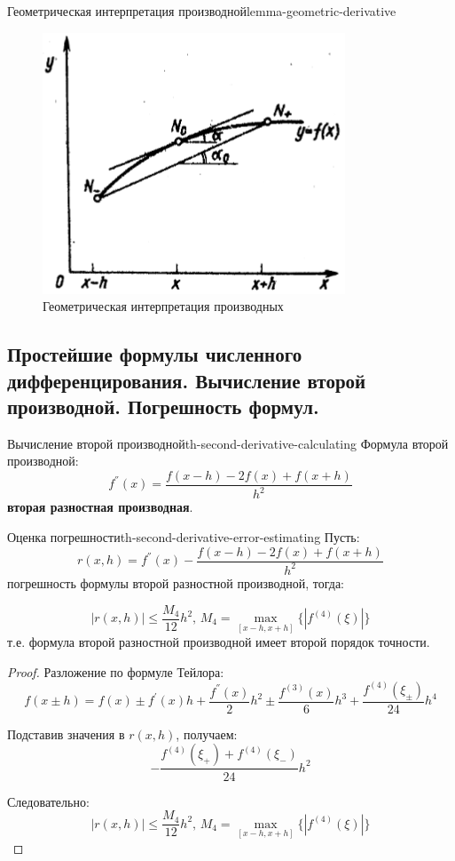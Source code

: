 \documentclass[14pt]{extarticle}
\begin{document}
\begin{lemma}{Геометрическая интерпретация производной}{lemma-geometric-derivative}
        \begin{figure}[H]
            \centering
            \includegraphics[scale=0.7]{images/geometric-derivative-ex-2.png}
            \caption{Геометрическая интерпретация производных}
            \label{fig:derivative-interpretation-2}
        \end{figure}
    \end{lemma}

\clearpage
\subsection{Простейшие формулы численного дифференцирования. Вычисление второй производной. Погрешность формул.}

    \begin{theorem}{Вычисление второй производной}{th-second-derivative-calculating}
        Формула второй производной:
        $$f^{''}(x) = \frac{f(x - h) - 2f(x) + f(x + h)}{h^{2}}$$
        \textbf{вторая разностная производная}.
    \end{theorem}

    \begin{theorem}{Оценка погрешности}{th-second-derivative-error-estimating}
        Пусть: 
        $$r(x, h) = f^{''}(x) - \frac{f(x - h) - 2f(x) + f(x + h)}{h^{2}}$$
        погрешность формулы второй разностной производной, тогда:

        $$|r(x, h)| \leq \frac{M_{4}}{12}h^{2} \text{, } M_{4} = \max_{[x - h, x + h]}\{|f^{(4)}(\xi)|\}$$
        т.е. формула второй разностной производной имеет второй порядок точности.

        \begin{proof}
            Разложение по формуле Тейлора:
            $$f(x \pm h) = f(x) \pm f^{'}(x)h + \frac{f^{''}(x)}{2}h^{2} \pm \frac{f^{(3)}(x)}{6} h^{3} + \frac{f^{(4)}(\xi_{\pm})}{24}h^{4}$$

            Подставив значения в $r(x, h)$, получаем:
            $$-\frac{f^{(4)}(\xi_{+}) + f^{(4)}(\xi_{-})}{24}h^{2}$$

            Следовательно:
            $$|r(x, h)| \leq \frac{M_{4}}{12}h^{2} \text{, } M_{4} = \max_{[x - h, x + h]}\{|f^{(4)}(\xi)|\}$$
        \end{proof}
    \end{theorem}
\end{document}
